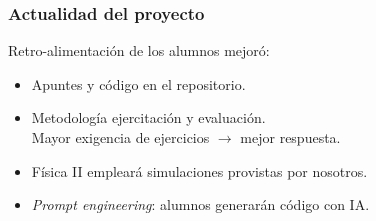 \documentclass[aspectratio=43]{beamer}
\begin{document}
\begin{frame}
	\frametitle{Actualidad del proyecto}
	\pause
	\begin{block}{}
		\begin{description}[<+->]
			\item [2023] Retro-alimentación de los alumnos mejoró:
				\begin{itemize}
					\item Apuntes y código en el repositorio.
					\item Metodología ejercitación y evaluación.\\
							Mayor exigencia de ejercicios \(\rightarrow\) mejor respuesta.
				\end{itemize}
			\item [2024] 
				\begin{itemize}
					\item Física II empleará simulaciones provistas por nosotros.
					\item \emph{Prompt engineering}: alumnos generarán código con IA.
				\end{itemize}
		\end{description}
	\end{block}
\end{frame}
\end{document}
